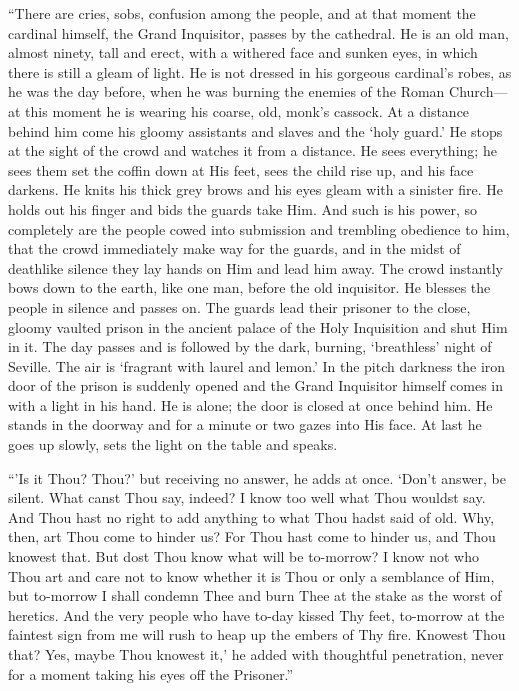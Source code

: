 ``There are cries, sobs, confusion among the people, and at that
moment the cardinal himself, the Grand Inquisitor, passes by the
cathedral. He is an old man, almost ninety, tall and erect, with a
withered face and sunken eyes, in which there is still a gleam of
light. He is not dressed in his gorgeous cardinal's robes, as he was
the day before, when he was burning the enemies of the Roman
Church---at this moment he is wearing his coarse, old, monk's cassock.
At a distance behind him come his gloomy assistants and slaves and the
`holy guard.' He stops at the sight of the crowd and watches it from a
distance. He sees  everything; he sees them set the coffin
down at His feet, sees the child rise up, and his face darkens. He
knits his thick grey brows and his eyes gleam with a sinister fire. He
holds out his finger and bids the guards take Him. And such is his
power, so completely are the people cowed into submission and
trembling obedience to him, that the crowd immediately make way for
the guards, and in the midst of deathlike silence they lay hands on
Him and lead him away. The crowd instantly bows down to the earth,
like one man, before the old inquisitor. He blesses the people in
silence and passes on. The guards lead their prisoner to the close,
gloomy vaulted prison in the ancient palace of the Holy Inquisition
and shut Him in it. The day passes and is followed by the dark,
burning, `breathless' night of Seville. The air is `fragrant with
laurel and lemon.' In the pitch darkness the iron door of the prison
is suddenly opened and the Grand Inquisitor himself comes in with a
light in his hand. He is alone; the door is closed at once behind him.
He stands in the doorway and for a minute or two gazes into His face.
At last he goes up slowly, sets the light on the table and speaks.

``'Is it Thou? Thou?' but receiving no answer, he adds at once. `Don't
answer, be silent. What canst Thou say, indeed? I know too well what
Thou wouldst say. And Thou hast no right to add anything to what Thou
hadst said of old. Why, then, art Thou come to hinder us? For Thou
hast come to hinder us, and Thou knowest that. But dost Thou know what
will be to-morrow? I know not who Thou art and care not to know
whether it is Thou or only a semblance of Him, but to-morrow I shall
condemn Thee and burn Thee at the stake as the worst of heretics. And
the very people who have to-day kissed Thy feet, to-morrow at the
faintest sign from me will rush to heap up the embers of Thy fire.
Knowest Thou that? Yes, maybe Thou knowest it,' he added with
thoughtful penetration, never for a moment taking his eyes off the
Prisoner.''

